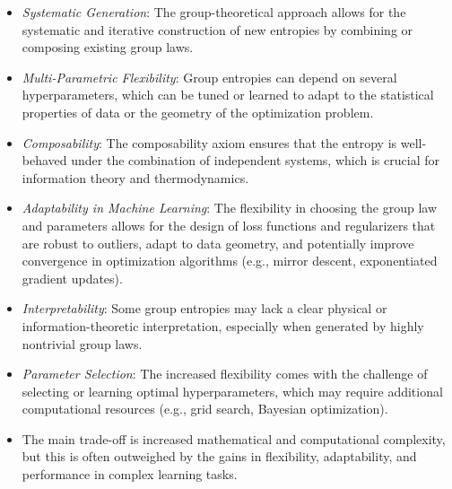 \documentclass[10pt]{amsart}
\theoremstyle{definition}
\theoremstyle{definition}	 %
\begin{document}
\begin{itemize}





   \item  {\it Systematic Generation}: The group-theoretical approach allows for the systematic and iterative construction of new entropies by combining or composing existing group laws.

\item {\it Multi-Parametric Flexibility}: Group entropies can depend on several hyperparameters, which can be tuned or learned to adapt to the statistical properties of data or the geometry of the optimization problem.

\item {\it Composability}: The composability axiom ensures that the entropy is well-behaved under the combination of independent systems, which is crucial for information theory and thermodynamics.


\item {\it Adaptability in Machine Learning}: The flexibility in choosing the group law and parameters allows for the design of loss functions and regularizers that are robust to outliers, adapt to data geometry, and potentially improve convergence in optimization algorithms (e.g., mirror descent, exponentiated gradient updates).


\item {\it Interpretability}: Some group entropies may lack a clear physical or information-theoretic interpretation, especially when generated by highly nontrivial group laws.

\item {\it Parameter Selection}: The increased flexibility comes with the challenge of selecting or learning optimal hyperparameters, which may require additional computational resources (e.g., grid search, Bayesian optimization).


\item The main trade-off is increased mathematical and computational complexity, but this is often outweighed by the gains in flexibility, adaptability, and performance in complex learning tasks.

    \end{itemize}
\end{document}
